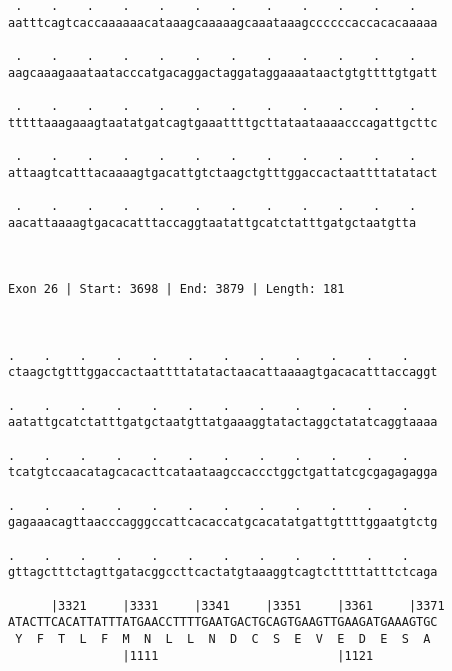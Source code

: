 \documentclass{article}
\begin{document}
\begin{Verbatim}
 .    .    .    .    .    .    .    .    .    .    .    .   
aatttcagtcaccaaaaaacataaagcaaaaagcaaataaagccccccaccacacaaaaa
                                                            
 .    .    .    .    .    .    .    .    .    .    .    .   
aagcaaagaaataatacccatgacaggactaggataggaaaataactgtgttttgtgatt
                                                            
 .    .    .    .    .    .    .    .    .    .    .    .   
tttttaaagaaagtaatatgatcagtgaaattttgcttataataaaacccagattgcttc
                                                            
 .    .    .    .    .    .    .    .    .    .    .    .   
attaagtcatttacaaaagtgacattgtctaagctgtttggaccactaattttatatact
                                                            
 .    .    .    .    .    .    .    .    .    .    .    .
aacattaaaagtgacacatttaccaggtaatattgcatctatttgatgctaatgtta
                                                         
                                                         
 
Exon 26 | Start: 3698 | End: 3879 | Length: 181



.    .    .    .    .    .    .    .    .    .    .    .    
ctaagctgtttggaccactaattttatatactaacattaaaagtgacacatttaccaggt
                                                            
.    .    .    .    .    .    .    .    .    .    .    .    
aatattgcatctatttgatgctaatgttatgaaaggtatactaggctatatcaggtaaaa
                                                            
.    .    .    .    .    .    .    .    .    .    .    .    
tcatgtccaacatagcacacttcataataagccaccctggctgattatcgcgagagagga
                                                            
.    .    .    .    .    .    .    .    .    .    .    .    
gagaaacagttaacccagggccattcacaccatgcacatatgattgttttggaatgtctg
                                                            
.    .    .    .    .    .    .    .    .    .    .    .    
gttagctttctagttgatacggccttcactatgtaaaggtcagtctttttatttctcaga
                                                            
      |3321     |3331     |3341     |3351     |3361     |3371
ATACTTCACATTATTTATGAACCTTTTGAATGACTGCAGTGAAGTTGAAGATGAAAGTGC
 Y  F  T  L  F  M  N  L  L  N  D  C  S  E  V  E  D  E  S  A 
                |1111                         |1121         
  

\end{Verbatim}
\end{document}
